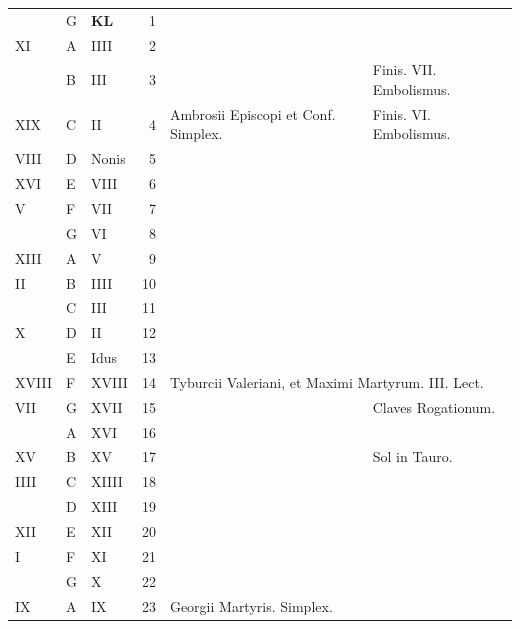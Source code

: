 \documentclass[11pt,openany]{book}
\begin{document}
\begin{center}
\begin{tabular}{l | l | l | r | l l}
\color{Red}  & G & \textbf{\color{Red} K\color{Blue}L} & 1 & & \color{Red} \\
\color{Red} XI & \color{Red} A & \color{Red} IIII & 2 & & \color{Red} \\
\color{Red}  & B & \color{Red} III & 3 & & Finis. VII. Embolismus. \color{Red} \\
\color{Red} XIX & C & \color{Red} II & 4 & Ambrosii Episcopi et Conf. Simplex. & \color{Red} Finis. VI. Embolismus. \\
\color{Red} VIII & D & \color{Red} Nonis & 5 & & \color{Red} \\
\color{Red} XVI & E & \color{Red} VIII & 6 & & \color{Red} \\
\color{Red} V & F & \color{Red} VII & 7 & & \color{Red} \\
\color{Red}  & G & \color{Red} VI & 8 & & \color{Red} \\
\color{Red} XIII & \color{Red} A & \color{Red} V & 9 & & \color{Red} \\
\color{Red} II & B & \color{Red} IIII & 10 & & \color{Red} \\
\color{Red}  & C & \color{Red} III & 11 & & \color{Red} \\
\color{Red} X & D & \color{Red} II & 12 & & \color{Red} \\
\color{Red}  & E & \color{Red} Idus & 13 & & \color{Red} \\
\color{Red} XVIII & F & \color{Red} XVIII & 14 & \multicolumn{2}{l}{Tyburcii Valeriani, et Maximi \color{Red} Martyrum. \color{black} III. Lect.} \color{Red} \\
\color{Red} VII & G & \color{Red} XVII & 15 & & \color{Red} Claves Rogationum. \\
\color{Red}  & \color{Red} A & \color{Red} XVI & 16 & \\
\color{Red} XV & B & \color{Red} XV & 17 & & Sol in Tauro. \color{Red} \\
\color{Red} IIII & C & \color{Red} XIIII & 18 & & \color{Red} \\
\color{Red}  & D & \color{Red} XIII & 19 & & \color{Red} \\
\color{Red} XII & E & \color{Red} XII & 20 & & \color{Red} \\
\color{Red} I & F & \color{Red} XI & 21 & & \color{Red} \\
\color{Red}  & G & \color{Red} X & 22 & & \color{Red} \\
\color{Red} IX & \color{Red} A & \color{Red} IX & 23 & Georgii Martyris. Simplex. & \color{Red} \\

\end{tabular}
\end{center}
\end{document}

